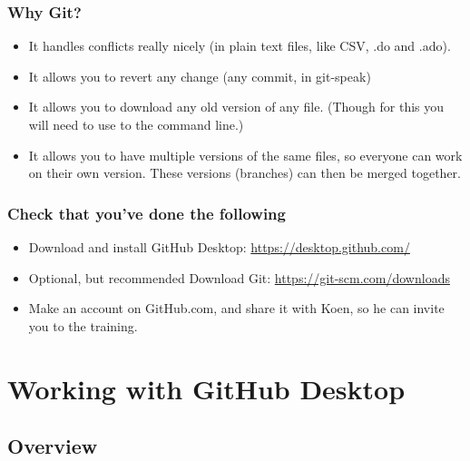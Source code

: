 \documentclass{beamer}
\begin{document}

\begin{frame}
	\frametitle{Why Git?}
	\begin{itemize}
		\item It handles conflicts really nicely (in plain text files, like CSV, .do and .ado).
		\item It allows you to revert any change (any commit, in git-speak)
		\item It allows you to download any old version of any file. (Though for this you will need to use to the command line.)
		\item It allows you to have multiple versions of the same files, so everyone can work on their own version. These versions (branches) can then be merged together.
	\end{itemize}
\end{frame}


\begin{frame}
\frametitle{Check that you've done the following}
	\begin{itemize}
		\item Download and install GitHub Desktop: \url{https://desktop.github.com/}
		\item Optional, but recommended Download Git: \url{https://git-scm.com/downloads} 
		\item Make an account on GitHub.com, and share it with Koen, so he can invite you to the training.
	\end{itemize}
\end{frame}

\section{Working with GitHub Desktop}

\subsection{Overview}
\end{document}
